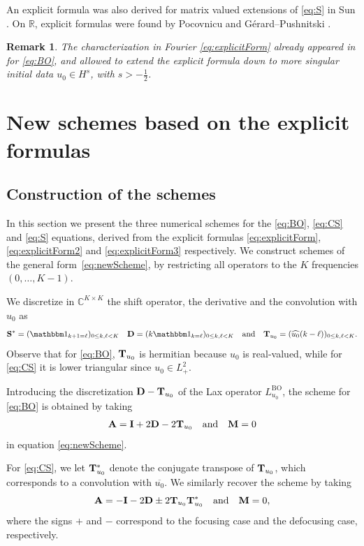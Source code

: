 \documentclass [11pt] {article}
\newtheorem{rem}[thm]{Remark}
\begin{document}
An explicit formula was also derived for matrix valued extensions of \eqref{eq:S} in Sun \cite{SunS}. On $\mathbb{R}$, explicit formulas were found by Pocovnicu \cite{P11} and Gérard--Pushnitski \cite{GP24}.

\begin{rem}\label{rem:Characterization}
The characterization in Fourier \eqref{eq:explicitForm} already appeared in \cite[Remark 5]{G} for \eqref{eq:BO}, and allowed to extend the explicit formula down to more singular initial data $u_0 \in H^s$, with $s>-\frac{1}{2}$.  
\end{rem}


\section{New schemes based on the explicit formulas}\label{sec:newSchemes}

\subsection{Construction of the schemes}

In this section we present the three numerical schemes for the \eqref{eq:BO}, \eqref{eq:CS} and \eqref{eq:S} equations, derived from the explicit formulas \eqref{eq:explicitForm}, \eqref{eq:explicitForm2} and \eqref{eq:explicitForm3} respectively. We construct schemes of the general form~\eqref{eq:newScheme}, by restricting all operators to the $K$ frequencies $(0, \dots, K-1)$.

We discretize in $\mathbb C^{K\times K}$ the shift operator, the derivative and the convolution with $u_0$ as 
\[
{\bf S}^*=(\mathbbm 1_{k+1=\ell})_{0\leq k,\ell < K}\quad 
{\bf D} = (k\mathbbm 1_{k=\ell})_{0\leq k,\ell < K}\quad \text{and}\quad
{\bf T}_{u_0} = (\widehat{u_0}(k-\ell))_{0\leq k,\ell < K}.
\]
Observe that for \eqref{eq:BO}, ${\bf T}_{u_0}$ is hermitian because $u_0$ is real-valued, while for \eqref{eq:CS} it is lower triangular since $u_0\in L^2_+$.

Introducing the discretization ${\bf D} - {\bf T}_{u_0}$ of the Lax operator $L_{u_0}^{\text{BO}}$, the scheme for \eqref{eq:BO} is obtained by taking 
\begin{equation}
\label{AM-BO}
{\bf A} = {\bf I} +2 {\bf D} -2 {\bf T}_{u_0} \quad \text{and} \quad {\bf M} = 0 
\end{equation}
in equation \eqref{eq:newScheme}.

For \eqref{eq:CS}, we let ${\bf T}_{u_0}^*$ denote the conjugate transpose of ${\bf T}_{u_0}$, which  corresponds to a convolution with $\overline{u_0}$. We similarly recover the scheme by taking
\begin{equation}
\label{AM-CS}
{\bf A} = {-\bf I} - 2 {\bf D} \pm 2{\bf T}_{u_0}{\bf T}_{u_0}^{*} \quad \text{and} \quad {\bf M} = 0,
\end{equation}
where the signs $+$ and $-$ correspond to the focusing case and the defocusing case, respectively.
\end{document}
